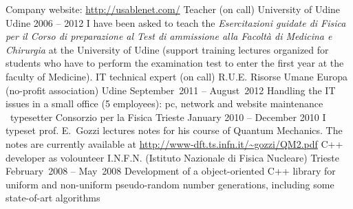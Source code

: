 \begin{cventries}
{%
Company website: \url{http://usablenet.com/}}
\cventry
{Teacher (on call)}
{University of Udine}
{Udine}
{2006 -- 2012}
{
   I have been asked to teach  the \emph{Esercitazioni guidate di Fisica per il Corso
      di preparazione al Test di ammissione alla Facolt\`a di Medicina e
      Chirurgia} at the University of Udine (support training lectures
   organized for students who have to perform the examination test to enter the
   first year at the faculty of Medicine).}
\cventry
{IT technical expert (on call)}
{R.U.E. Risorse Umane Europa (no-profit
   association)}
{Udine}
{September~2011 -- August~2012}
{
   Handling the IT issues in a small office (5 employees): pc, network and
   website maintenance}
\cventry
{\LaTeXe\ typesetter}
{Consorzio per la Fisica}
{Trieste}
{January 2010 -- December 2010}
{   I typeset prof. E.~Gozzi lectures notes for his course of Quantum Mechanics.
   The notes are currently available at 
   \url{http://www-dft.ts.infn.it/~gozzi/QM2.pdf}}
\cventry
{C++ developer as volounteer}
{I.N.F.N. (Istituto Nazionale di Fisica
   Nucleare)}
{Trieste}
{February~2008 -- May~2008}
{Development of a object-oriented C++ library for uniform and non-uniform
   pseudo-random number generations, including some state-of-art algorithms}

\end{cventries}
